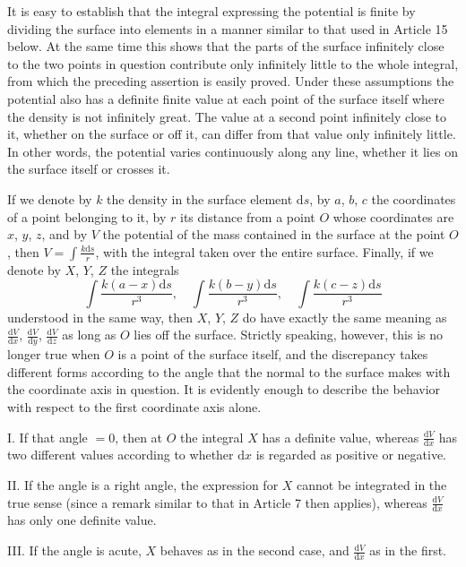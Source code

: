 \expandafter\def\csname HistoricalNoteText22\endcsname{It is easy to establish that the integral expressing the potential is finite by dividing the surface into elements in a manner similar to that used in Article 15 below. At the same time this shows that the parts of the surface infinitely close to the two points in question contribute only infinitely little to the whole integral, from which the preceding assertion is easily proved.}%
Under these assumptions the potential also has a definite finite value at each point of the surface itself where the density is not infinitely great. The value at a second point infinitely close to it, whether on the surface or off it, can differ from that value only infinitely little. In other words, the potential varies continuously along any line, whether it lies on the surface itself or crosses it.

If we denote by $k$ the density in the surface element $\mathrm{d}s$, by
%
$a$, $b$, $c$ the coordinates of a point belonging to it, by $r$ its distance from a point $O$ whose coordinates are $x$, $y$, $z$, and by $V$ the potential of the mass contained in the surface at the point $O$, then $V=\int\frac{k\mathrm{d}s}{r}$, with the integral taken over the entire surface. Finally, if we denote by $X$, $Y$, $Z$ the integrals
\[
\int\frac{k(a-x)\mathrm{d}s}{r^3},\quad\int\frac{k(b-y)\mathrm{d}s}{r^3},\quad\int\frac{k(c-z)\mathrm{d}s}{r^3}
\]
understood in the same way, then $X$, $Y$, $Z$ do have exactly the same meaning as $\frac{\mathrm{d}V}{\mathrm{d}x}$, $\frac{\mathrm{d}V}{\mathrm{d}y}$, $\frac{\mathrm{d}V}{\mathrm{d}z}$ as long as $O$ lies off the surface. Strictly speaking, however, this is no longer true when $O$ is a point of the surface itself, and the discrepancy takes different forms according to the angle that the normal to the surface makes with the coordinate axis in question. It is evidently enough to describe the behavior with respect to the first coordinate axis alone.

I. If that angle $=0$, then at $O$ the integral $X$ has a definite value, whereas $\frac{\mathrm{d}V}{\mathrm{d}x}$ has two different values according to whether $\mathrm{d}x$ is regarded as positive or negative.

II. If the angle is a right angle, the expression for $X$ cannot be integrated in the true sense (since a remark similar to that in Article 7 then applies), whereas $\frac{\mathrm{d}V}{\mathrm{d}x}$ has only one definite value.

III. If the angle is acute, $X$ behaves as in the second case, and $\frac{\mathrm{d}V}{\mathrm{d}x}$ as in the first.

